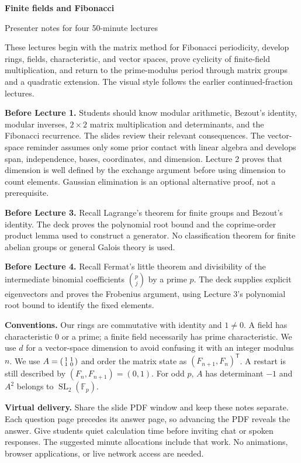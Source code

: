 \documentclass[11pt]{article}
\newcommand{\F}{\mathbb F}
\newcommand{\SL}{\operatorname{SL}}
\newcounter{slide}
\begin{document}
{\huge\bfseries Finite fields and Fibonacci\par}
{\Large Presenter notes for four 50-minute lectures\par}
\vspace{10pt}
These lectures begin with the matrix method for Fibonacci periodicity,
develop rings, fields, characteristic, and vector spaces, prove cyclicity
of finite-field multiplication, and return to the prime-modulus period
through matrix groups and a quadratic extension.
The visual style follows the earlier continued-fraction lectures.

\textbf{Before Lecture 1.}
Students should know modular arithmetic, Bezout's identity, modular
inverses, $2\times2$ matrix multiplication and determinants, and the
Fibonacci recurrence. The slides review their relevant consequences.
The vector-space reminder assumes only some prior contact with linear
algebra and develops span, independence, bases, coordinates, and dimension.
Lecture 2 proves that dimension is well defined by the exchange argument
before using dimension to count elements. Gaussian elimination is an
optional alternative proof, not a prerequisite.

\textbf{Before Lecture 3.}
Recall Lagrange's theorem for finite groups and Bezout's identity.
The deck proves the polynomial root bound and the coprime-order product
lemma used to construct a generator. No classification theorem for
finite abelian groups or general Galois theory is used.

\textbf{Before Lecture 4.}
Recall Fermat's little theorem and divisibility of the intermediate
binomial coefficients $\binom pj$ by a prime $p$. The deck supplies
explicit eigenvectors and proves the Frobenius argument, using Lecture 3's
polynomial root bound to identify the fixed elements.

\textbf{Conventions.}
Our rings are commutative with identity and $1\ne0$. A field has
characteristic $0$ or a prime; a finite field necessarily has prime
characteristic. We use $d$ for a vector-space dimension to avoid
confusing it with an integer modulus $n$. We use
$A=\begin{psmallmatrix}1&1\\1&0\end{psmallmatrix}$ and order the matrix
state as $(F_{n+1},F_n)^{\mathsf T}$. A restart is still described by
$(F_n,F_{n+1})=(0,1)$. For odd $p$, $A$ has determinant $-1$ and
$A^2$ belongs to $\SL_2(\F_p)$.

\textbf{Virtual delivery.}
Share the slide PDF window and keep these notes separate. Each question
page precedes its answer page, so advancing the PDF reveals the answer.
Give students quiet calculation time before inviting chat or spoken
responses. The suggested minute allocations include that work. No
animations, browser applications, or live network access are needed.
\end{document}
